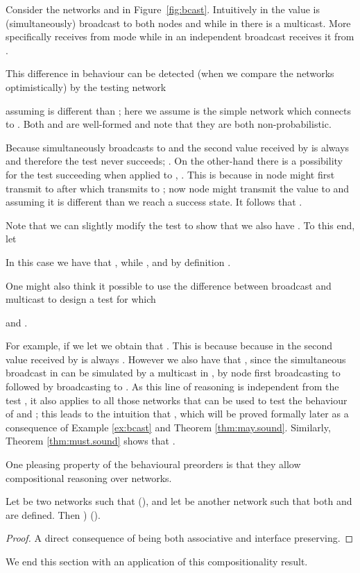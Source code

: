 \documentclass{LMCS}
\begin{document}
 \begin{exa}\label{ex:bcast1}
   Consider the networks  and  in Figure~\ref{fig:bcast}. 
Intuitively in  the value  is (simultaneously) broadcast to both nodes 
and  while in  there is a multicast. More specifically  receives  from
mode  while in an independent broadcast  receives it from . 

This difference in behaviour can be detected (when we compare the networks optimistically) by the testing network

assuming  is different than ; here we assume  is the simple network which connects  to 
.  
Both  and  are well-formed and note that
they are both non-probabilistic. 

Because  simultaneously broadcasts to  and  the second value received by
 is always  and therefore the test never succeeds; . 
On the other-hand there is a possibility for the test succeeding when applied to , 
.  This is because in  node  might first transmit  to 
 after which  transmits  to ; now node  might transmit the value  to  
and assuming it is different than  we reach a success state. It follows that 
. 

Note that we can slightly modify the test  to show that we 
also have . To this end, let 

In this case we have that , while 
, and by definition 
.

One might also think it possible to use the difference between broadcast and multicast to design a test 
 for which 
 
and . 

For example, if we let  we obtain that . 
This is because because in  the second value received by  is always . 
However we also have that , since the
simultaneous broadcast in  can be simulated by a multicast in , 
by node  first broadcasting to  followed by
 broadcasting to . As this line of reasoning is independent from the test , 
it also applies to all those networks that can be used to test the behaviour of  and ; 
this leads to the intuition that , which will be proved formally later 
as a consequence of Example \ref{ex:bcast} and Theorem \ref{thm:may.sound}. 
Similarly, Theorem \ref{thm:must.sound} shows that .

\end{exa}

One pleasing property of the behavioural preorders is that they allow 
compositional reasoning over networks.
\begin{prop}[Compositionality]
\label{prop:compmay}
Let  be two networks such that  
(), and 
let  be another network such that both  and  
are defined. Then ) 
().
\end{prop}
\begin{proof}
A direct consequence of  being both associative and interface preserving.
\end{proof}
\noindent
We end this section with an 
application of this compositionality result.
\end{document}
